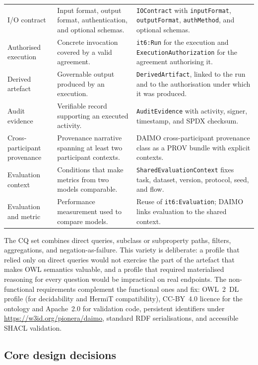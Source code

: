 \documentclass[Afour,sagev,times]{sagej}
\newcommand{\code}[1]{\texttt{#1}}
\begin{document}
\begin{table}[tb]
\begin{tabular}{@{}p{2.8cm}p{4.9cm}p{6.8cm}@{}}
I/O contract & Input format, output format, authentication, and optional schemas. & \code{IOContract} with \code{inputFormat}, \code{outputFormat}, \code{authMethod}, and optional schemas. \\
Authorised execution & Concrete invocation covered by a valid agreement. & \code{it6:Run} for the execution and \code{ExecutionAuthorization} for the agreement authorising it. \\
Derived artefact & Governable output produced by an execution. & \code{DerivedArtifact}, linked to the run and to the authorisation under which it was produced. \\
Audit evidence & Verifiable record supporting an executed activity. & \code{AuditEvidence} with activity, signer, timestamp, and SPDX checksum. \\
Cross-participant provenance & Provenance narrative spanning at least two participant contexts. & DAIMO cross-participant provenance class as a PROV bundle with explicit contexts. \\
Evaluation context & Conditions that make metrics from two models comparable. & \code{SharedEvaluationContext} fixes task, dataset, version, protocol, seed, and flow. \\
Evaluation and metric & Performance measurement used to compare models. & Reuse of \code{it6:Evaluation}; DAIMO links evaluation to the shared context. \\
\bottomrule
\end{tabular}
\end{table}

The CQ set combines direct queries, subclass or subproperty paths, filters, aggregations, and negation-as-failure. This variety is deliberate: a profile that relied only on direct queries would not exercise the part of the artefact that makes OWL semantics valuable, and a profile that required materialised reasoning for every question would be impractical on real endpoints. The non-functional requirements complement the functional ones and fix: OWL~2~DL profile (for decidability and HermiT compatibility), CC-BY~4.0 licence for the ontology and Apache~2.0 for validation code, persistent identifiers under \url{https://w3id.org/pionera/daimo}, standard RDF serialisations, and accessible SHACL validation.

\subsection{Core design decisions}\label{sec:method-design}
\end{document}
